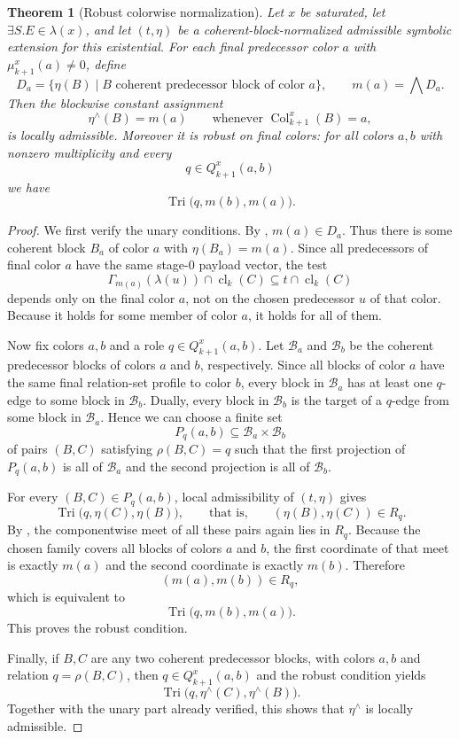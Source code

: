 \documentclass[11pt]{article}
\newtheorem{theorem}{Theorem}[section]
\theoremstyle{definition}
\newcommand{\cld}[2]{\operatorname{cl}_{#1}(#2)}
\newcommand{\Tri}{\operatorname{Tri}}
\newcommand{\Col}{\operatorname{Col}}
\newcommand{\meet}{\mathbin{\wedge}}
\newcommand{\bigmeet}{\mathop{\bigwedge}}
\begin{document}
\begin{theorem}[Robust colorwise normalization]\label{thm:robust-normalization}
Let $x$ be saturated, let $\exists S.E\in\lambda(x)$, and let $(t,\eta)$ be a coherent-block-normalized admissible symbolic extension for this existential. For each final predecessor color $a$ with $\mu^x_{k+1}(a)\neq 0$, define
\[
D_a=\{\eta(B)\mid B\text{ coherent predecessor block of color }a\},
\qquad
m(a)=\bigmeet D_a.
\]
Then the blockwise constant assignment
\[
\eta^{\meet}(B)=m(a)
\qquad\text{whenever }\Col^x_{k+1}(B)=a,
\]
is locally admissible. Moreover it is \emph{robust on final colors}: for all colors $a,b$ with nonzero multiplicity and every
\[
q\in Q^x_{k+1}(a,b)
\]
we have
\[
\Tri\bigl(q,m(b),m(a)\bigr).
\]
\end{theorem}

\begin{proof}
We first verify the unary conditions. By , $m(a)\in D_a$. Thus there is some coherent block $B_a$ of color $a$ with $\eta(B_a)=m(a)$. Since all predecessors of final color $a$ have the same stage-$0$ payload vector, the test
\[
\Gamma_{m(a)}(\lambda(u))\cap \cld{k}{C}\subseteq t\cap \cld{k}{C}
\]
depends only on the final color $a$, not on the chosen predecessor $u$ of that color. Because it holds for some member of color $a$, it holds for all of them.

Now fix colors $a,b$ and a role $q\in Q^x_{k+1}(a,b)$. Let $\mathcal B_a$ and $\mathcal B_b$ be the coherent predecessor blocks of colors $a$ and $b$, respectively. Since all blocks of color $a$ have the same final relation-set profile to color $b$, every block in $\mathcal B_a$ has at least one $q$-edge to some block in $\mathcal B_b$. Dually, every block in $\mathcal B_b$ is the target of a $q$-edge from some block in $\mathcal B_a$. Hence we can choose a finite set
\[
P_q(a,b)\subseteq \mathcal B_a\times \mathcal B_b
\]
of pairs $(B,C)$ satisfying $\rho(B,C)=q$ such that the first projection of $P_q(a,b)$ is all of $\mathcal B_a$ and the second projection is all of $\mathcal B_b$.

For every $(B,C)\in P_q(a,b)$, local admissibility of $(t,\eta)$ gives
\[
\Tri\bigl(q,\eta(C),\eta(B)\bigr),
\qquad\text{that is,}\qquad
(\eta(B),\eta(C))\in R_q.
\]
By , the componentwise meet of all these pairs again lies in $R_q$. Because the chosen family covers all blocks of colors $a$ and $b$, the first coordinate of that meet is exactly $m(a)$ and the second coordinate is exactly $m(b)$. Therefore
\[
(m(a),m(b))\in R_q,
\]
which is equivalent to
\[
\Tri\bigl(q,m(b),m(a)\bigr).
\]
This proves the robust condition.

Finally, if $B,C$ are any two coherent predecessor blocks, with colors $a,b$ and relation $q=\rho(B,C)$, then $q\in Q^x_{k+1}(a,b)$ and the robust condition yields
\[
\Tri\bigl(q,\eta^{\meet}(C),\eta^{\meet}(B)\bigr).
\]
Together with the unary part already verified, this shows that $\eta^{\meet}$ is locally admissible.
\end{proof}
\end{document}
